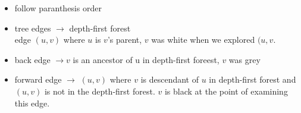 \begin{itemize}
	\item follow paranthesis order
	\item tree edges $\rightarrow$ depth-first forest \\
		edge $(u,v)$ where $u$ is $v$'s parent, $v$ was white when we explored
		$(u,v$.
	\item back edge $\rightarrow$$v$ is an ancestor of u in depth-first foreest, $v$ was grey
	\item forward edge  $\rightarrow$ $(u,v)$ where $v$ is descendant of $u$ in
	depth-first forest and $(u,v)$ is not in the depth-first forest. $v$ is
	black at the point of examining this edge.
\end{itemize}






















